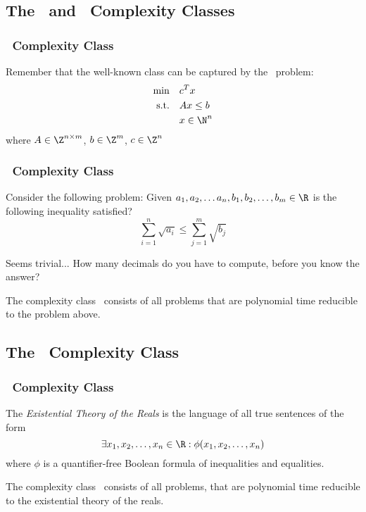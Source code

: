 \documentclass[english, aspectratio=169]{beamer}
\begin{document}
\subsection{The \cNP\ and \cSqrtSum\ Complexity Classes}
\begin{frame}
  \frametitle{\cNP\ Complexity Class}

  Remember that the well-known class \cNP can be captured by the \cILP\ problem:
  \begin{align*}
    \min \quad  &c^T x
    \\
    \text{s.t.} \quad
                &Ax \leq b
    \\
                &x \in \N^n
  \end{align*}
  where $A \in \Z^{n \times m}$, $b \in \Z^m$, $c \in \Z^n$
\end{frame}

\begin{frame}
  \frametitle{\cSqrtSum\ Complexity Class}

  Consider the following problem: Given $a_1, a_2, \dots a_n, b_1, b_2, \dots,
  b_m \in \R$ is the following inequality satisfied?
  \begin{equation*}
    \sum_{i=1}^n \sqrt{a_i} \leq \sum_{j=1}^m \sqrt{b_j}
  \end{equation*}

  Seems trivial... \pause How many decimals do you have to compute, before you
  know the answer? \footnotemark


  \begin{definition}[\cSqrtSum]
    The complexity class \cSqrtSum\ consists of all problems that are polynomial
    time reducible to the problem above.
  \end{definition}
\end{frame}


\subsection{The \cETR\ Complexity Class}
\begin{frame}
  \frametitle{\cETR\ Complexity Class}

  The \emph{Existential Theory of the Reals} is the language of all true
  sentences of the form
  \begin{equation*}
    \exists x_1, x_2, \dots, x_n \in \R : \phi(x_1, x_2, \dots, x_n)
  \end{equation*}
  where $\phi$ is a quantifier-free Boolean formula of inequalities and
  equalities.

  \pause
  \begin{definition}[\cETR]
    The complexity class \cETR\ consists of all problems, that are polynomial
    time reducible to the existential theory of the reals.
  \end{definition}
\end{frame}
\end{document}
